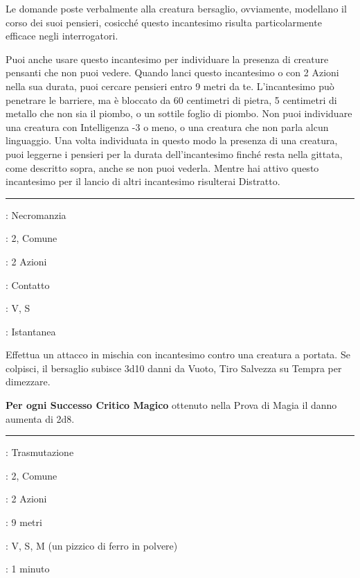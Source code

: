 \begin{multicols}{2}
Le domande poste verbalmente alla creatura bersaglio, ovviamente, modellano il corso dei suoi pensieri, cosicché questo incantesimo risulta particolarmente efficace negli interrogatori.

Puoi anche usare questo incantesimo per individuare la presenza di creature pensanti che non puoi vedere. Quando lanci questo incantesimo o con 2 Azioni nella sua durata, puoi cercare pensieri entro 9 metri da te. L'incantesimo può penetrare le barriere, ma è bloccato da 60 centimetri di pietra, 5 centimetri di metallo che non sia il piombo, o un sottile foglio di piombo. Non puoi individuare una creatura con Intelligenza -3 o meno, o una creatura che non parla alcun linguaggio. Una volta individuata in questo modo la presenza di una creatura, puoi leggerne i pensieri per la durata dell'incantesimo finché resta nella gittata, come descritto sopra, anche se non puoi vederla.
Mentre hai attivo questo incantesimo per il lancio di altri incantesimo risulterai Distratto.

\smallskip\noindent\rule{\linewidth}{2pt} \hypertarget{Infliggi Ferite}{}\smallskip{}
\noindent
\begin{description}[noitemsep, topsep=0pt, parsep=0pt, partopsep=0pt, leftmargin=0cm, labelwidth=2.8cm]
	\item[\textbf{Lista di Magia}]: Necromanzia
	\item[\textbf{Livello}]: 2, Comune
	\item[\textbf{T. di Lancio}]: 2 Azioni
	\item[\textbf{Gittata}]: Contatto
	\item[\textbf{Componenti}]: V, S
	\item[\textbf{Durata}]: Istantanea
\end{description}

Effettua un attacco in mischia con incantesimo contro una creatura a portata. Se colpisci, il bersaglio subisce 3d10 danni da Vuoto, Tiro Salvezza su Tempra per dimezzare.

\textbf{Per ogni Successo Critico Magico} ottenuto nella Prova di Magia il danno aumenta di 2d8.

\smallskip\noindent\rule{\linewidth}{2pt} \hypertarget{Ingrandire/Ridurre}{}\smallskip{}
\noindent
\begin{description}[noitemsep, topsep=0pt, parsep=0pt, partopsep=0pt, leftmargin=0cm, labelwidth=2.8cm]
	\item[\textbf{Lista di Magia}]: Trasmutazione
	\item[\textbf{Livello}]: 2, Comune
	\item[\textbf{T. di Lancio}]: 2 Azioni
	\item[\textbf{Gittata}]: 9 metri
	\item[\textbf{Componenti}]: V, S, M (un pizzico di ferro in polvere)
	\item[\textbf{Durata}]: 1 minuto
\end{description}


\end{multicols}
